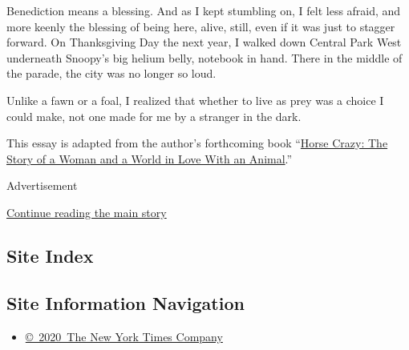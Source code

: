 Benediction means a blessing. And as I kept stumbling on, I felt less
afraid, and more keenly the blessing of being here, alive, still, even
if it was just to stagger forward. On Thanksgiving Day the next year, I
walked down Central Park West underneath Snoopy's big helium belly,
notebook in hand. There in the middle of the parade, the city was no
longer so loud.

Unlike a fawn or a foal, I realized that whether to live as prey was a
choice I could make, not one made for me by a stranger in the dark.

This essay is adapted from the author's forthcoming book
``\href{https://www.simonandschuster.com/books/Horse-Crazy/Sarah-Maslin-Nir/9781501196232}{Horse
Crazy: The Story of a Woman and a World in Love With an Animal}.''

Advertisement

\protect\hyperlink{after-bottom}{Continue reading the main story}

\hypertarget{site-index}{%
\subsection{Site Index}\label{site-index}}

\hypertarget{site-information-navigation}{%
\subsection{Site Information
Navigation}\label{site-information-navigation}}

\begin{itemize}
\tightlist
\item
  \href{https://help.nytimes3xbfgragh.onion/hc/en-us/articles/115014792127-Copyright-notice}{©~2020~The
  New York Times Company}
\end{itemize}

